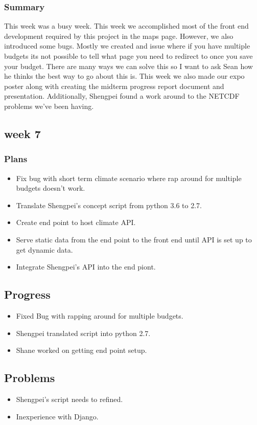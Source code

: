 \documentclass[onecolumn, draftclsnofoot,10pt, compsoc]{article}
\begin{document}
			\subsubsection{Summary} This week was a busy week. This week we accomplished most of the front end development required by this project in the maps page. However, we also introduced some bugs. Mostly we created and issue where if you have multiple budgets its not possible to tell what page you need to redirect to once you save your budget. There are many ways we can solve this so I want to ask Sean how he thinks the best way to go about this is. This week we also made our expo poster along with creating the midterm progress report document and presentation. Additionally, Shengpei found a work around to the NETCDF problems we've been having.\\
			
		\subsection{week 7}
			\subsubsection{Plans}
				\begin{itemize}
					\item Fix bug with short term climate scenario where rap around for multiple budgets doesn't work.
					\item Translate Shengpei's concept script from python 3.6 to 2.7.
					\item Create end point to host climate API.
					\item Serve static data from the end point to the front end until API is set up to get dynamic data.
					\item Integrate Shengpei's API into the end piont.
				\end{itemize}
			\subsection{Progress}
				\begin{itemize}
					\item Fixed Bug with rapping around for multiple budgets.
					\item Shengpei translated script into python 2.7.
					\item Shane worked on getting end point setup.
				\end{itemize}
			\subsection{Problems}
				\begin{itemize}
					\item Shengpei's script needs to refined.
					\item Inexperience with Django.
				\end{itemize}
\end{document}
